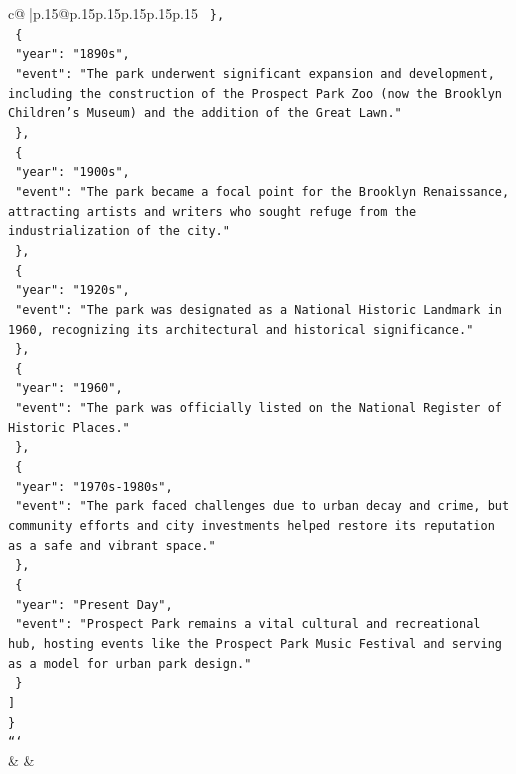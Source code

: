\documentclass{article}
\begin{document}
{\begin{supertabular}{c@{$\;$}|p{.15\linewidth}@{}p{.15\linewidth}p{.15\linewidth}p{.15\linewidth}p{.15\linewidth}p{.15\linewidth}}
{{{\texttt{    \},} \\
\texttt{    \{} \\
\texttt{      "year": "1890s",} \\
\texttt{      "event": "The park underwent significant expansion and development, including the construction of the Prospect Park Zoo (now the Brooklyn Children's Museum) and the addition of the Great Lawn."} \\
\texttt{    \},} \\
\texttt{    \{} \\
\texttt{      "year": "1900s",} \\
\texttt{      "event": "The park became a focal point for the Brooklyn Renaissance, attracting artists and writers who sought refuge from the industrialization of the city."} \\
\texttt{    \},} \\
\texttt{    \{} \\
\texttt{      "year": "1920s",} \\
\texttt{      "event": "The park was designated as a National Historic Landmark in 1960, recognizing its architectural and historical significance."} \\
\texttt{    \},} \\
\texttt{    \{} \\
\texttt{      "year": "1960",} \\
\texttt{      "event": "The park was officially listed on the National Register of Historic Places."} \\
\texttt{    \},} \\
\texttt{    \{} \\
\texttt{      "year": "1970s{-}1980s",} \\
\texttt{      "event": "The park faced challenges due to urban decay and crime, but community efforts and city investments helped restore its reputation as a safe and vibrant space."} \\
\texttt{    \},} \\
\texttt{    \{} \\
\texttt{      "year": "Present Day",} \\
\texttt{      "event": "Prospect Park remains a vital cultural and recreational hub, hosting events like the Prospect Park Music Festival and serving as a model for urban park design."} \\
\texttt{    \}} \\
\texttt{  {]}} \\
\texttt{\}} \\
\texttt{```} \\
            }
        }
    }
    & & \\ \\


\end{supertabular}}
\end{document}

